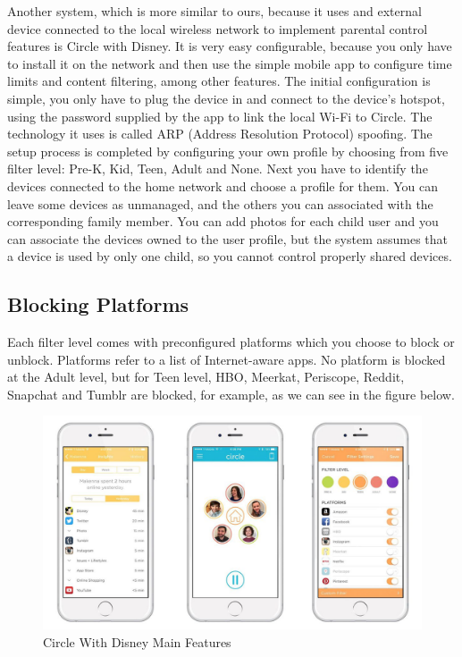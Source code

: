 Another system, which is more similar to ours, because it uses and external device connected to the local wireless network to implement parental control features is Circle with Disney. It is very easy configurable, because you only have to install it on the network and then use the simple mobile app to configure time limits and content filtering, among other features. The initial configuration is simple, you only have to plug the device in and connect to the device's hotspot, using the password supplied by the app to link the local Wi-Fi to Circle. The technology it uses is called ARP (Address Resolution Protocol) spoofing. The setup process is completed by configuring your own profile by choosing from five filter level: Pre-K, Kid, Teen, Adult and None. Next you have to identify the devices connected to the home network and choose a profile for them. You can leave some devices as unmanaged, and the others you can associated with the corresponding family member. You can add photos for each child user and you can associate the devices owned to the user profile, but the system assumes that a device is used by only one child, so you cannot control properly shared devices. \parencite{circlePCMag}

\subsection{Blocking Platforms}

Each filter level comes with preconfigured platforms which you choose to block or unblock. Platforms refer to a list of Internet-aware apps. No platform is blocked at the Adult level, but for Teen level, HBO, Meerkat, Periscope, Reddit, Snapchat and Tumblr are blocked, for example, as we can see in the figure below. \parencite{circleMashable}

\begin{figure}[th]
\centering
\includegraphics[width=1\textwidth]{Figures/circle}
\decoRule
\caption{Circle With Disney Main Features}
\label{fig:circle}
\end{figure}

